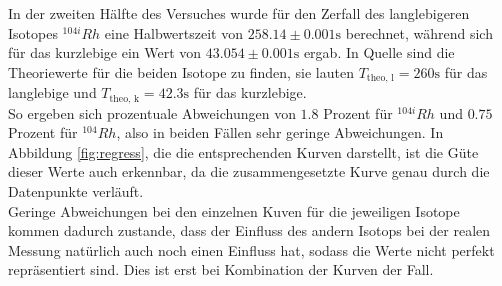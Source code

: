 In der zweiten Hälfte des Versuches wurde für den Zerfall des langlebigeren Isotopes $^{104i}Rh$
eine Halbwertszeit von $258.14 \pm 0.001 \si{\s}$ berechnet, während sich für das kurzlebige ein Wert von $43.054 \pm 0.001 \si{\s}$ ergab. In Quelle \cite{rhodium}
sind die Theoriewerte für die beiden Isotope zu finden, sie lauten $T_{\text{theo, l}} = 260 \si{\s}$ für das langlebige und $T_{\text{theo, k}} = 42.3 \si{\s}$ für
das kurzlebige. \\
So ergeben sich prozentuale Abweichungen von $1.8$ Prozent für $^{104i}Rh$
und $0.75$ Prozent für $^{104}Rh$, also in beiden Fällen sehr geringe Abweichungen. In Abbildung \ref{fig:regress}, die die entsprechenden Kurven darstellt, ist die Güte dieser 
Werte auch erkennbar, da die zusammengesetzte Kurve genau durch die Datenpunkte verläuft. \\
Geringe Abweichungen bei den einzelnen Kuven für die jeweiligen Isotope kommen dadurch zustande, dass der Einfluss des andern Isotops bei der realen Messung natürlich auch noch
einen Einfluss hat, sodass die Werte nicht perfekt repräsentiert sind. Dies ist erst bei Kombination der Kurven der Fall. 
